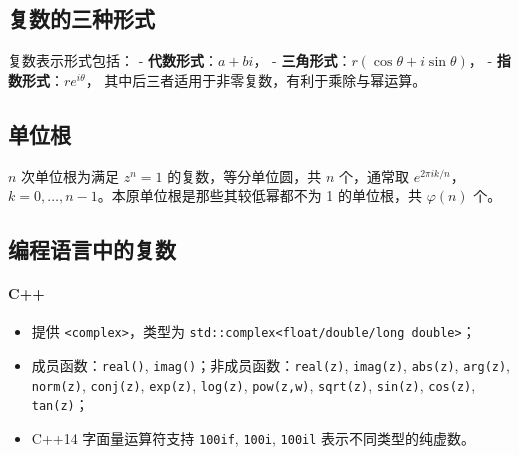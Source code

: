 \documentclass[12pt, a4paper, oneside]{ctexbook}
\begin{document}
\subsection*{复数的三种形式}
复数表示形式包括：
- \textbf{代数形式}：$a + bi$，
- \textbf{三角形式}：$r(\cos\theta + i\sin\theta)$，
- \textbf{指数形式}：$re^{i\theta}$，
其中后三者适用于非零复数，有利于乘除与幂运算。

\subsection*{单位根}
$n$ 次单位根为满足 $z^n = 1$ 的复数，等分单位圆，共 $n$ 个，通常取 $e^{2\pi i k/n}$，$k=0,\dots,n-1$。本原单位根是那些其较低幂都不为 1 的单位根，共 $\varphi(n)$ 个。

\subsection*{编程语言中的复数}

\paragraph{C++}
\begin{itemize}
  \item 提供 \texttt{<complex>}，类型为 \texttt{std::complex<float/double/long double>}；
  \item 成员函数：\texttt{real()}, \texttt{imag()}；非成员函数：\texttt{real(z)}, \texttt{imag(z)}, \texttt{abs(z)}, \texttt{arg(z)}, \texttt{norm(z)}, \texttt{conj(z)}, \texttt{exp(z)}, \texttt{log(z)}, \texttt{pow(z,w)}, \texttt{sqrt(z)}, \texttt{sin(z)}, \texttt{cos(z)}, \texttt{tan(z)}；
  \item C++14 字面量运算符支持 \texttt{100if}, \texttt{100i}, \texttt{100il} 表示不同类型的纯虚数。
\end{itemize}
\end{document}
